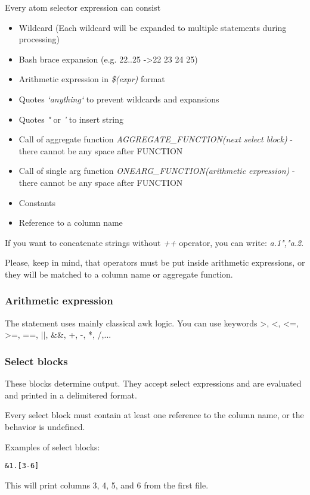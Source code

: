 Every atom selector expression can consist
\begin{itemize}
    \item Wildcard (Each wildcard will be expanded to multiple statements during processing)
    \item Bash brace expansion (e.g. {22..25} -\textgreater 22 23 24 25) \cite{bash-reference-manual}
    \item Arithmetic expression in \textit{\$(expr)} format
    \item Quotes \textit{`anything`} to prevent wildcards and expansions
    \item Quotes \textit{"} or \textit{'} to insert string
    \item Call of aggregate function \textit{AGGREGATE\_FUNCTION(next select block)} - there cannot be any space after FUNCTION
    \item Call of single arg function \textit{ONEARG\_FUNCTION(arithmetic expression)} - there cannot be any space after FUNCTION
    \item Constants
    \item Reference to a column name
\end{itemize}

If you want to concatenate strings without \textit{++} operator, you can write: \textit{a.1","a.2}.

Please, keep in mind, that operators must be put inside arithmetic expressions, or they will be matched to a column name or aggregate function.

\subsubsection{Arithmetic expression}
The statement uses mainly classical awk logic.\cite{awk-reference-manual} You can use keywords \textgreater, \textless, \textless=, \textgreater=, ==, $\vert\vert$, \&\&, +, -, *, /,...

\subsubsection{Select blocks}
These blocks determine output. They accept select expressions and are evaluated and printed in a delimitered format.

Every select block must contain at least one reference to the column name, or the behavior is undefined.

Examples of select blocks:
\begin{verbatim}
&1.[3-6]
\end{verbatim}
This will print columns 3, 4, 5, and 6 from the first file.

